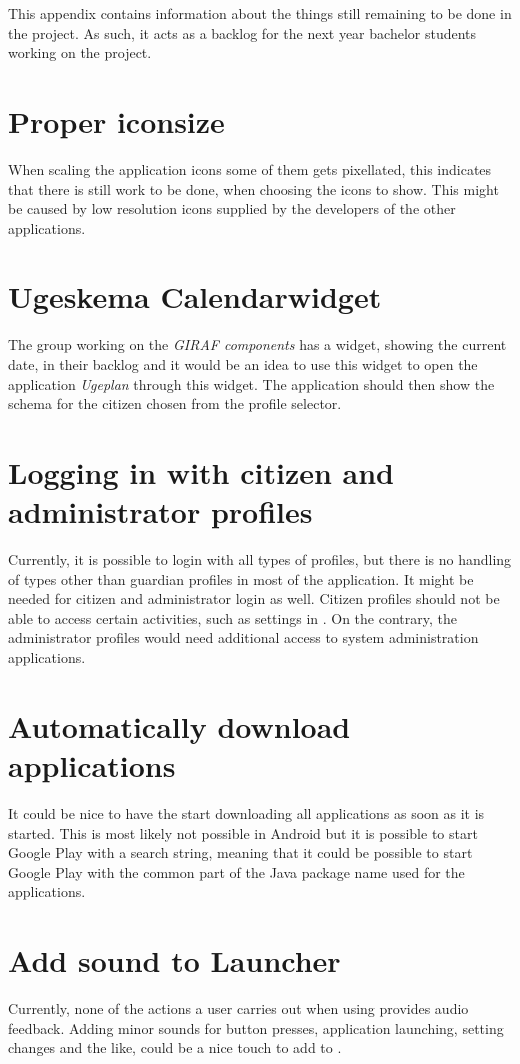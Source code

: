 This appendix contains information about the things still remaining to be done in the \launcher project.
As such, it acts as a backlog for the next year bachelor students working on the project.

\section{Proper iconsize}
When scaling the application icons some of them gets pixellated, this indicates that there is still work to be done, when choosing the icons to show. This might be caused by low resolution icons supplied by the developers of the other applications.

\section{Ugeskema Calendarwidget}
The group working on the \textit{GIRAF components} has a widget, showing the current date, in their backlog and it would be an idea to use this widget to open the application \textit{Ugeplan} through this widget. The application should then show the schema for the citizen chosen from the profile selector.

\section{Logging in with citizen and administrator profiles}
Currently, it is possible to login with all types of profiles, but there is no handling of types other than guardian profiles in most of the application.
It might be needed for citizen and administrator login as well.
Citizen profiles should not be able to access certain activities, such as settings in \launcher.
On the contrary, the administrator profiles would need additional access to system administration applications.

\section{Automatically download \giraf applications}
It could be nice to have the \launcher start downloading all \giraf applications as soon as it is started.
This is most likely not possible in Android but it is possible to start Google Play with a search string, meaning that it could be possible to start Google Play with the common part of the Java package name used for the \giraf applications.

\section{Add sound to Launcher}
Currently, none of the actions a user carries out when using \launcher provides audio feedback.
Adding minor sounds for button presses, application launching, setting changes and the like, could be a nice touch to add to \launcher. 

